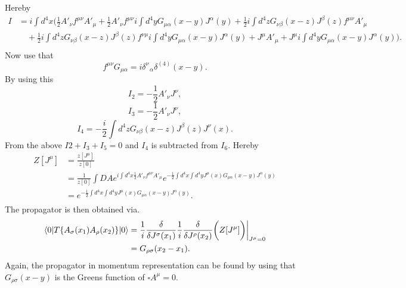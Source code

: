 Hereby
 \begin{equation}
	\begin{split}
		I&=i \int d^4x \bigg(\frac{1}{2}A'_\nu f^{\mu\nu}A'_\mu+\frac{1}{2}A'_\nu f^{\mu\nu}i\int d^4y G_{\mu\alpha}(x-y)J^\alpha(y)+\frac{1}{2}i\int d^4z G_{\nu\beta}(x-z)J^\beta(z)f^{\mu\nu}A'_\mu\\
		&\quad+\frac{1}{2}i\int d^4z G_{\nu\beta}(x-z)J^\beta(z)f^{\nu\mu}i\int d^4y G_{\mu\alpha}(x-y)J^\alpha(y)+J^\mu A'_\mu+J^\mu i\int d^4y G_{\mu\alpha}(x-y)J^\alpha(y)\bigg).\\
	\end{split}
\end{equation} 
Now use that
\begin{equation}
	f^{\mu\nu}G_{\mu\alpha}=i\delta^\nu_{\,\,\,\,\alpha}\delta^{(4)}(x-y).
\end{equation} 
By using this
\begin{equation}
	I_2=-\frac{1}{2}A'_\nu J^\nu,
\end{equation} 
\begin{equation}
	I_3=-\frac{1}{2}A'_\nu J^\nu,
\end{equation} 
\begin{equation}
	I_4=-\frac{i}{2}\int d^4z G_{\nu\beta}(x-z)J^\beta(z)J^\nu(x).
\end{equation} 
From the above $I2+I_3+I_5=0$ and $I_4$ is subtracted from $I_6$. Hereby
\begin{equation}
	\begin{split}
		Z[J^\mu]&=\frac{z[J^\mu]}{z[0]}\\
		&=\frac{1}{z[0]}\int DAe^{i\int d^4x\frac{1}{2}A'_\nu f^{\mu\nu}A'_\mu}e^{-\frac{1}{2}\int d^4x\int d^4y J^\mu(x)G_{\mu\alpha}(x-y)J^\alpha(y)}\\
		&=e^{-\frac{1}{2}\int d^4x\int d^4y J^\mu(x)G_{\mu\alpha}(x-y)J^\alpha(y)}.\\
	\end{split}
\end{equation} 
The propagator is then obtained via.
\begin{equation}
	\begin{split}
		\braket{0|T\{A_\sigma(x_1)A_\rho(x_2)\}|0}&=\frac{1}{i}\frac{\delta}{\delta J^\sigma(x_1)}\frac{1}{i}\frac{\delta}{\delta J^\rho(x_2)}\bigg(Z[J^\mu]\bigg)\bigg|_{J^\mu=0}\\
		&=G_{\rho\sigma}(x_2-x_1).
	\end{split}
\end{equation} 
Again, the propagator in momentum representation can be found by using that $G_{\rho\sigma}(x-y)$ is the Greens function of $\square A^\mu=0$. 


